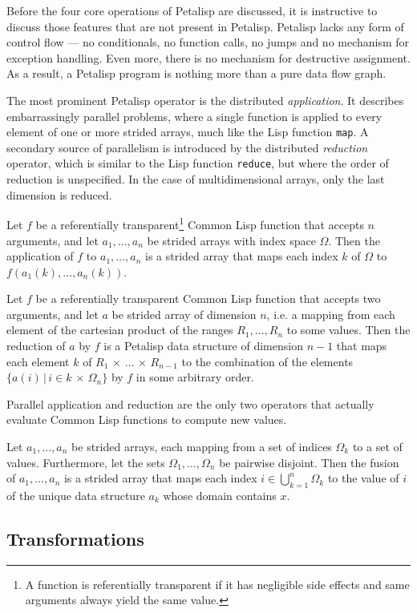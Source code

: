 Before the four core operations of Petalisp are discussed, it is
instructive to discuss those features that are not present in
Petalisp. Petalisp lacks any form of control flow --- no conditionals, no
function calls, no jumps and no mechanism for exception handling. Even
more, there is no mechanism for destructive assignment. As a result, a
Petalisp program is nothing more than a pure data flow graph.

The most prominent Petalisp operator is the distributed
\emph{application}. It describes embarrassingly parallel problems, where a
single function is applied to every element of one or more strided arrays,
much like the Lisp function \texttt{map}. A secondary source of parallelism
is introduced by the distributed \emph{reduction} operator, which is
similar to the Lisp function \texttt{reduce}, but where the order of
reduction is unspecified. In the case of multidimensional arrays, only the
last dimension is reduced.

\begin{define}[application]
  Let $f$ be a referentially transparent\footnote{A function is
    referentially transparent if it has negligible side effects and same
    arguments always yield the same value.} Common Lisp function that
  accepts $n$ arguments, and let $a_{1}, \ldots, a_{n}$ be strided arrays
  with index space $\Omega$. Then the application of $f$ to
  $a_{1}, \ldots, a_{n}$ is a strided array that maps each index $k$ of
  $\Omega$ to $f( a_{1}(k), \ldots, a_{n}(k) )$.
\end{define}

\begin{define}[reduction]
  Let $f$ be a referentially transparent Common Lisp function that accepts
  two arguments, and let $a$ be strided array of dimension $n$, i.e. a
  mapping from each element of the cartesian product of the ranges
  $R_{1}, \ldots, R_{n}$ to some values. Then the reduction of $a$ by $f$
  is a Petalisp data structure of dimension $n-1$ that maps each element
  $k$ of $R_{1} \,\times\, \ldots \, \times \, R_{n-1}$ to the combination of the
  elements $\{ a(i) \,|\, i \in k \,\times\, \Omega_{n} \}$ by $f$ in some
  arbitrary order.
\end{define}

Parallel application and reduction are the only two operators that actually
evaluate Common Lisp functions to compute new values.

\begin{define}[fusion]
  Let $a_{1}, \ldots, a_{n}$ be strided arrays, each mapping from a set of
  indices $\Omega_{k}$ to a set of values.  Furthermore, let the sets
  $\Omega_{1}, \ldots, \Omega_{n}$ be pairwise disjoint. Then the fusion of
  $a_{1},\ldots, a_{n}$ is a strided array that maps each index
  $i \in \bigcup_{k=1}^{n} \Omega_{k}$ to the value of $i$ of the unique data
  structure $a_{k}$ whose domain contains $x$.
\end{define}


\subsection{Transformations}